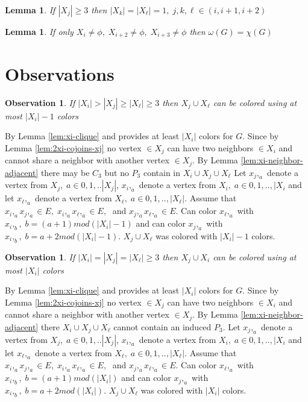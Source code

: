 \documentclass[12pt]{article}
\newtheorem{Lemma}[Theorem]{Lemma}
\newtheorem{Observation}[Theorem]{Observation}
\begin{document}
\begin{Lemma}\label{lem:three-consecutive-xi}
If $|X_j| \geq 3$ then $|X_k| = |X_\ell| = 1,\; j,k,\ell \in ({i,i+1,i+2})$
\end{Lemma}

\begin{Lemma}\label{lem:coloring-xi-xi2-xi3}
If only $X_i \neq \phi,\; X_{i+2} \neq \phi,\; X_{i+3} \neq \phi$ then $ \omega(G) = \chi(G)$
\end{Lemma}

\section{Observations}\label{sec:obs}
\begin{Observation}\label{obs:xi-g}
If $|X_i| > |X_j| \geq |X_\ell| \geq 3$ then $X_j \cup X_\ell$ can be colored using at most $|X_i| - 1$ colors
\end{Observation} 
 By Lemma \ref{lem:xi-clique} and provides at least $|X_i|$ colors for $G$. Since by Lemma \ref{lem:2xi-cojoins-xj} no vertex $\in X_j$ can have two neighbors $\in X_i$ and cannot share a neighbor with another vertex $\in X_j$. By Lemma \ref{lem:xi-neighbor-adjacent} there may be $C_3$ but no $P_3$ contain in $X_i \cup X_j \cup X_\ell$ Let $x_j,_a$ denote a vertex from $X_j,\; a \in {0, 1,..|X_j|}$, $x_i,_a$ denote a vertex from $X_i,\; a \in {0, 1,.., |X_i}$ and let $x_\ell,_a$ denote a vertex from $X_\ell, \; a \in {0, 1,.., |X_\ell|}$. Assume that $x_i,_ax_j,_a \in E,\; x_i,_ax_\ell,_a \in E,\;$ and $ x_j,_ax_\ell,_a \in E$. Can color $x_\ell,_a$ with $x_i,_{b},\; b = (a +1) mod (|X_i| - 1)$ and can color $x_j,_a$ with $x_i,_{b},\; b = a+2 mod(|X_i| - 1)$.  $X_j \cup X_\ell$ was colored with $|X_i| - 1$ colors.

\begin{Observation}\label{obs:all-equal}
If $|X_i| = |X_j| = |X_\ell| \geq 3$ then $X_j \cup X_i$ can be colored using at most $|X_i|$ colors
\end{Observation}
 By Lemma \ref{lem:xi-clique} and provides at least $|X_i|$ colors for $G$. Since by Lemma \ref{lem:2xi-cojoins-xj} no vertex $\in X_j$ can have two neighbors $\in X_i$ and cannot share a neighbor with another vertex $\in X_j$. By Lemma \ref{lem:xi-neighbor-adjacent} there $X_i \cup X_j \cup X_\ell$ cannot contain an induced $P_3$. Let $x_j,_a$ denote a vertex from $X_j,\; a \in {0, 1,..|X_j|}$, $x_i,_a$ denote a vertex from $X_i,\; a \in {0, 1,.., |X_i}$ and let $x_\ell,_a$ denote a vertex from $X_\ell, \; a \in {0, 1,.., |X_\ell|}$. Assume that $x_i,_ax_j,_a \in E,\; x_i,_ax_\ell,_a \in E,\;$ and $ x_j,_ax_\ell,_a \in E$. Can color $x_\ell,_a$ with $x_i,_{b},\; b = (a +1) mod (|X_i|)$ and can color $x_j,_a$ with $x_i,_{b},\; b = a+2 mod(|X_i|)$.  $X_j \cup X_\ell$ was colored with $|X_i|$ colors.
\end{document}
